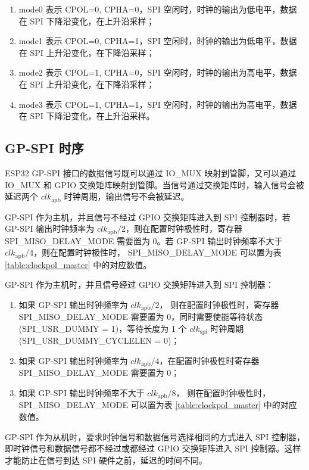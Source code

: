 \documentclass[main\_\_CN.tex]{subfiles}
\begin{document}
\begin{enumerate}
    \item mode0 表示 CPOL=0, CPHA=0，SPI 空闲时，时钟的输出为低电平，数据在 SPI 下降沿变化，在上升沿采样；
    \item mode1 表示 CPOL=0, CPHA=1，SPI 空闲时，时钟的输出为低电平，数据在 SPI 上升沿变化，在下降沿采样；
    \item mode2 表示 CPOL=1, CPHA=0，SPI 空闲时，时钟的输出为高电平，数据在 SPI 上升沿变化，在下降沿采样；
    \item mode3 表示 CPOL=1, CPHA=1，SPI 空闲时，时钟的输出为高电平，数据在 SPI 下降沿变化，在上升沿采样。
\end{enumerate}


\subsection{GP-SPI 时序}\label{GP-SPI Timing}

ESP32 GP-SPI 接口的数据信号既可以通过 IO\_MUX 映射到管脚，又可以通过 IO\_MUX 和 GPIO 交换矩阵映射到管脚。当信号通过交换矩阵时，输入信号会被延迟两个 $clk_{\textrm{apb}}$ 时钟周期，输出信号不会被延迟。

GP-SPI 作为主机，并且信号不经过 GPIO 交换矩阵进入到 SPI 控制器时，若 GP-SPI 输出时钟频率为 $clk_{\textrm{apb}}/2$，则在配置时钟极性时，寄存器 SPI\_MISO\_DELAY\_MODE 需要置为 0。若 GP-SPI 输出时钟频率不大于 $clk_{\textrm{apb}}/4$，则在配置时钟极性时， SPI\_MISO\_DELAY\_MODE 可以置为表 \ref{table:clockpol_master} 中的对应数值。

GP-SPI 作为主机时，并且信号经过 GPIO 交换矩阵进入到 SPI 控制器：
\begin{enumerate}
    \item 如果 GP-SPI 输出时钟频率为 $clk_{\textrm{apb}}/2$， 则在配置时钟极性时，寄存器 SPI\_MISO\_DELAY\_MODE 需要置为 0，同时需要使能等待状态 (SPI\_USR\_DUMMY = 1)，等待长度为 1 个 $clk_{\textrm{spi}}$ 时钟周期\\(SPI\_USR\_DUMMY\_CYCLELEN = 0)；
    \item 如果 GP-SPI 输出时钟频率为 $clk_{\textrm{apb}}/4$，在配置时钟极性时寄存器 SPI\_MISO\_DELAY\_MODE 需要置为 0；
    \item 如果 GP-SPI 输出时钟频率不大于 $clk_{\textrm{apb}}/8$， 则在配置时钟极性时，SPI\_MISO\_DELAY\_MODE 可以置为表 \ref{table:clockpol_master} 中的对应数值。
\end{enumerate}

GP-SPI 作为从机时，要求时钟信号和数据信号选择相同的方式进入 SPI 控制器，即时钟信号和数据信号都不经过或都经过 GPIO 交换矩阵进入 SPI 控制器。这样才能防止在信号到达 SPI 硬件之前，延迟的时间不同。
\end{document}
